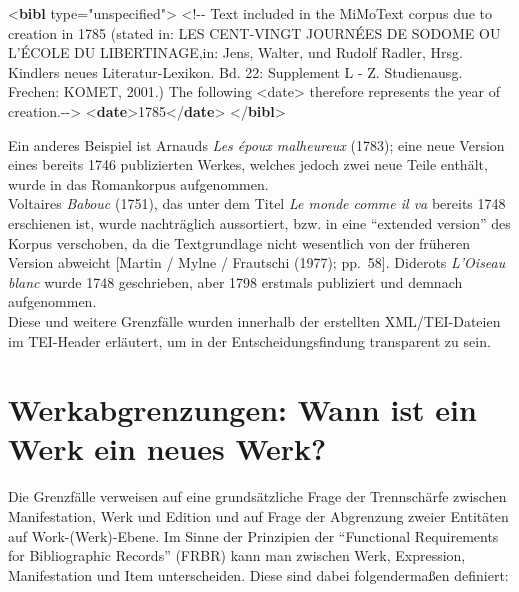 \documentclass[
  12pt,
  letterpaper,
  DIV=11,
  numbers=noendperiod]{scrreprt}
\newenvironment{Shaded}{\begin{snugshade}}{\end{snugshade}}
\newcommand{\CommentTok}[1]{\textcolor[rgb]{0.37,0.37,0.37}{#1}}
\newcommand{\KeywordTok}[1]{\textcolor[rgb]{0.00,0.23,0.31}{\textbf{#1}}}
\newcommand{\NormalTok}[1]{\textcolor[rgb]{0.00,0.23,0.31}{#1}}
\newcommand{\OtherTok}[1]{\textcolor[rgb]{0.00,0.23,0.31}{#1}}
\newcommand{\StringTok}[1]{\textcolor[rgb]{0.13,0.47,0.30}{#1}}
\begin{document}
\begin{Shaded}
\begin{Highlighting}[]
\NormalTok{\textless{}}\KeywordTok{bibl}\OtherTok{ type=}\StringTok{"unspecified"}\NormalTok{\textgreater{}}
\CommentTok{\textless{}!{-}{-} Text included in the MiMoText corpus due to creation in 1785 }
\CommentTok{(stated in: LES CENT{-}VINGT JOURNÉES DE SODOME OU L’ÉCOLE DU }
\CommentTok{LIBERTINAGE,in: Jens, Walter, und Rudolf Radler, Hrsg. Kindlers neues Literatur{-}Lexikon. Bd.}
\CommentTok{22: Supplement L {-} Z. Studienausg. Frechen: KOMET, 2001.) }
\CommentTok{The following \textless{}date\textgreater{} therefore represents the year of creation.{-}{-}\textgreater{}}
\NormalTok{\textless{}}\KeywordTok{date}\NormalTok{\textgreater{}1785\textless{}/}\KeywordTok{date}\NormalTok{\textgreater{}}
\NormalTok{\textless{}/}\KeywordTok{bibl}\NormalTok{\textgreater{}}
\end{Highlighting}
\end{Shaded}

Ein anderes Beispiel ist Arnauds \emph{Les époux malheureux} (1783);
eine neue Version eines bereits 1746 publizierten Werkes, welches jedoch
zwei neue Teile enthält, wurde in das Romankorpus aufgenommen.\\
Voltaires \emph{Babouc} (1751), das unter dem Titel \emph{Le monde comme
il va} bereits 1748 erschienen ist, wurde nachträglich aussortiert, bzw.
in eine ``extended version'' des Korpus verschoben, da die Textgrundlage
nicht wesentlich von der früheren Version abweicht {[}Martin / Mylne /
Frautschi (1977); pp.~58{]}. Diderots \emph{L'Oiseau blanc} wurde 1748
geschrieben, aber 1798 erstmals publiziert und demnach aufgenommen.\\
Diese und weitere Grenzfälle wurden innerhalb der erstellten
XML/TEI-Dateien im TEI-Header erläutert, um in der Entscheidungsfindung
transparent zu sein.

\section{Werkabgrenzungen: Wann ist ein Werk ein neues
Werk?}\label{werkabgrenzungen-wann-ist-ein-werk-ein-neues-werk}

Die Grenzfälle verweisen auf eine grundsätzliche Frage der Trennschärfe
zwischen Manifestation, Werk und Edition und auf Frage der Abgrenzung
zweier Entitäten auf Work-(Werk)-Ebene. Im Sinne der Prinzipien der
``Functional Requirements for Bibliographic Records'' (FRBR) kann man
zwischen Werk, Expression, Manifestation und Item unterscheiden. Diese
sind dabei folgendermaßen definiert:
\end{document}

